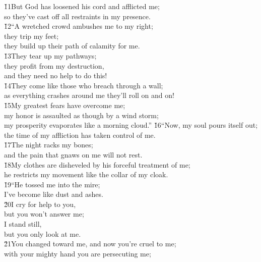 \begin{poetry}
\poeml \v{11}But God has loosened his cord and afflicted me; \\
\poemll    so they've cast off all restraints in my presence. \\
\poeml \v{12}``A wretched crowd ambushes me to my right; \\
\poemll    they trip my feet; \\
\poemlll       they build up their path of calamity for me. \\
\poeml \v{13}They tear up my pathways; \\
\poemll    they profit from my destruction, \\
\poemlll       and they need no help to do this! \\
\poeml \v{14}They come like those who breach through a wall; \\
\poemll    as everything crashes around me they'll roll on and on! \\
\poeml \v{15}My greatest fears have overcome me; \\
\poemll    my honor is assaulted as though by a wind storm; \\
\poemlll       my prosperity evaporates like a morning cloud.''
\poeml \v{16}``Now, my soul pours itself out; \\
\poemll    the time of my affliction has taken control of me. \\
\poeml \v{17}The night racks my bones; \\
\poemll    and the pain that gnaws on me will not rest. \\
\poeml \v{18}My clothes are disheveled by his forceful treatment of me; \\
\poemll    he restricts my movement like the collar of my cloak. \\
\poeml \v{19}``He tossed me into the mire; \\
\poemll    I've become like dust and ashes. \\
\poeml \v{20}I cry for help to you, \\
\poemll    but you won't answer me; \\
\poeml I stand still, \\
\poemll    but you only look at me. \\
\poeml \v{21}You changed toward me, and now you're cruel to me; \\
\poemll    with your mighty hand you are persecuting me; \\

\end{poetry}

